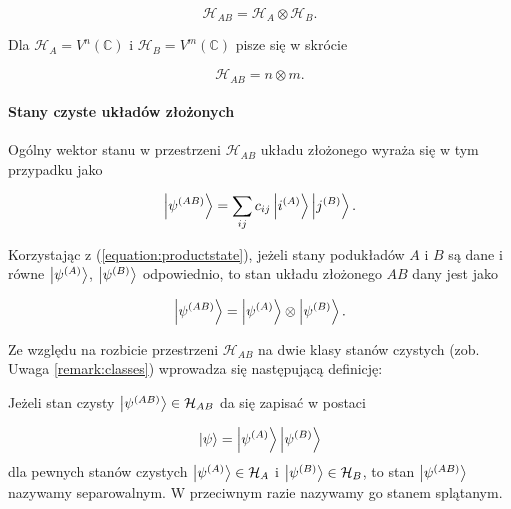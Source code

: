 $$
    \mathcal{H}_{AB} = \mathcal{H}_{A} \otimes \mathcal{H}_{B}.
$$

\begin{remark}
    Dla $\mathcal{H}_A = V ^ n(\mathbb{C})$ i $\mathcal{H}_B = V ^ m(\mathbb{C})$ pisze się w skrócie

    \begin{equation}
        \label{equation:bipartite}
        \mathcal{H}_{AB} = n \otimes m.
    \end{equation}
\end{remark}

\paragraph{Stany czyste układów złożonych}

Ogólny wektor stanu w przestrzeni $\mathcal{H}_{AB}$ układu złożonego wyraża się w tym przypadku jako

\begin{equation}
    \label{equation:complexpure}
    \ket{\psi^{(AB)}} = \sum\limits_{ij} c_{ij} \ket{i^{(A)}} \ket{j^{(B)}}.
\end{equation}

Korzystając z (\ref{equation:productstate}), jeżeli stany podukładów $A$ i $B$ są dane i równe $\ket{\psi^{(A)}}$, $\ket{\psi^{(B)}}$ odpowiednio, to stan układu złożonego $AB$ dany jest jako

$$
    \ket{\psi^{(AB)}} = \ket{\psi^{(A)}} \otimes \ket{\psi^{(B)}}.
$$

Ze względu na rozbicie przestrzeni $\mathcal{H}_{AB}$ na dwie klasy stanów czystych (zob. Uwaga \ref{remark:classes}) wprowadza się następującą definicję:

\begin{definition}
    Jeżeli stan czysty $\ket{\psi^{(AB)}} \in \mathcal{H}_{AB}$ da się zapisać w postaci

    $$
        \ket{\psi} = \ket{\psi ^ {(A)}} \ket{\psi ^ {(B)}}
    $$
    dla pewnych stanów czystych $\ket{\psi ^ {(A)}} \in \mathcal{H}_A$ i $\ket{\psi ^ {(B)}} \in \mathcal{H}_B$, to stan $\ket{\psi^{(AB)}}$ nazywamy separowalnym. W przeciwnym razie nazywamy go stanem splątanym.
\end{definition}

